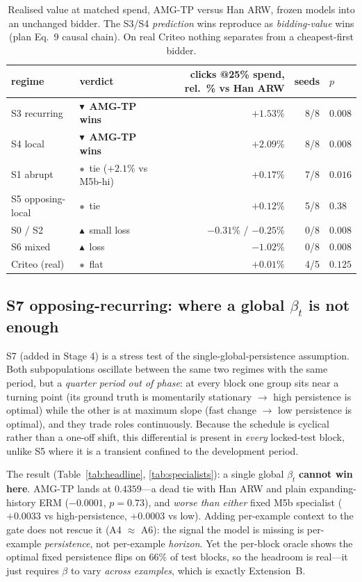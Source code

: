 \documentclass[11pt]{article}
\newcommand{\win}{\textcolor{green!45!black}{$\blacktriangledown$}}
\newcommand{\loss}{\textcolor{red!70!black}{$\blacktriangle$}}
\newcommand{\tie}{\textcolor{gray}{$\bullet$}}
\begin{document}
\begin{table}[H]
\centering
\small
\begin{tabular}{@{}llrrl@{}}
\toprule
regime & verdict & clicks @25\% spend, rel.\ \% vs Han ARW & seeds & $p$ \\
\midrule
S3 recurring      & \win\ \textbf{AMG-TP wins} & $+1.53\%$ & 8/8 & $0.008$ \\
S4 local          & \win\ \textbf{AMG-TP wins} & $+2.09\%$ & 8/8 & $0.008$ \\
S1 abrupt         & \tie\ tie ($+2.1\%$ vs M5b-hi) & $+0.17\%$ & 7/8 & $0.016$ \\
S5 opposing-local & \tie\ tie & $+0.12\%$ & 5/8 & $0.38$ \\
S0 / S2           & \loss\ small loss & $-0.31\%$ / $-0.25\%$ & 0/8 & $0.008$ \\
S6 mixed          & \loss\ loss & $-1.02\%$ & 0/8 & $0.008$ \\
Criteo (real)     & \tie\ flat & $+0.01\%$ & 4/5 & $0.125$ \\
\bottomrule
\end{tabular}
\caption{Realised value at matched spend, AMG-TP versus Han ARW, frozen models
into an unchanged bidder. The S3/S4 \emph{prediction} wins reproduce as
\emph{bidding-value} wins (plan Eq.~9 causal chain). On real Criteo nothing
separates from a cheapest-first bidder.}
\end{table}

\subsection{S7 opposing-recurring: where a global $\beta_t$ is not enough}
\label{sec:s7}

S7 (added in Stage 4) is a stress test of the single-global-persistence
assumption. Both subpopulations oscillate between the same two regimes with the
same period, but a \emph{quarter period out of phase}: at every block one group
sits near a turning point (its ground truth is momentarily stationary $\to$ high
persistence is optimal) while the other is at maximum slope (fast change $\to$
low persistence is optimal), and they trade roles continuously. Because the
schedule is cyclical rather than a one-off shift, this differential is present
in \emph{every} locked-test block, unlike S5 where it is a transient confined to
the development period.

The result (Table~\ref{tab:headline}, \ref{tab:specialists}): a single global
$\beta_t$ \textbf{cannot win here}. AMG-TP lands at $0.4359$---a dead tie with
Han ARW and plain expanding-history ERM ($-0.0001$, $p=0.73$), and
\emph{worse than either} fixed M5b specialist ($+0.0033$ vs high-persistence,
$+0.0003$ vs low). Adding per-example context to the gate does not rescue it
(A4 $\approx$ A6): the signal the model is missing is per-example
\emph{persistence}, not per-example \emph{horizon}. Yet the per-block oracle
shows the optimal fixed persistence flips on 66\% of test blocks, so the
headroom is real---it just requires $\beta$ to vary \emph{across examples},
which is exactly Extension~B.
\end{document}
